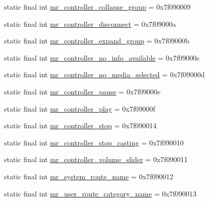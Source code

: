 \begin{CompactItemize}
\item 
static final int \hyperlink{classandroid_1_1support_1_1v7_1_1recyclerview_1_1_r_1_1string_75f471dcd88bd056d87ffdd26c831260}{mr\_\-controller\_\-collapse\_\-group} = 0x7f090009
\item 
static final int \hyperlink{classandroid_1_1support_1_1v7_1_1recyclerview_1_1_r_1_1string_8d0d9b278c876e697764cfe5bd5a7927}{mr\_\-controller\_\-disconnect} = 0x7f09000a
\item 
static final int \hyperlink{classandroid_1_1support_1_1v7_1_1recyclerview_1_1_r_1_1string_bd4773d756cf6048b5a33fa54cecfcad}{mr\_\-controller\_\-expand\_\-group} = 0x7f09000b
\item 
static final int \hyperlink{classandroid_1_1support_1_1v7_1_1recyclerview_1_1_r_1_1string_d6450755a675989679bec2088b9b10ed}{mr\_\-controller\_\-no\_\-info\_\-available} = 0x7f09000c
\item 
static final int \hyperlink{classandroid_1_1support_1_1v7_1_1recyclerview_1_1_r_1_1string_4b2053531010813cf927df1e6850ee00}{mr\_\-controller\_\-no\_\-media\_\-selected} = 0x7f09000d
\item 
static final int \hyperlink{classandroid_1_1support_1_1v7_1_1recyclerview_1_1_r_1_1string_41ad07dfb413e1e9961fa1dd73c8149d}{mr\_\-controller\_\-pause} = 0x7f09000e
\item 
static final int \hyperlink{classandroid_1_1support_1_1v7_1_1recyclerview_1_1_r_1_1string_3f9d46b56fe9b8dc07cf8994c078a47e}{mr\_\-controller\_\-play} = 0x7f09000f
\item 
static final int \hyperlink{classandroid_1_1support_1_1v7_1_1recyclerview_1_1_r_1_1string_45495f4083f80e1227b339e35cf4f636}{mr\_\-controller\_\-stop} = 0x7f090014
\item 
static final int \hyperlink{classandroid_1_1support_1_1v7_1_1recyclerview_1_1_r_1_1string_61f96113f71ae5198305f1952eb86227}{mr\_\-controller\_\-stop\_\-casting} = 0x7f090010
\item 
static final int \hyperlink{classandroid_1_1support_1_1v7_1_1recyclerview_1_1_r_1_1string_3ff268c14acd6a823db6676bff7f29e4}{mr\_\-controller\_\-volume\_\-slider} = 0x7f090011
\item 
static final int \hyperlink{classandroid_1_1support_1_1v7_1_1recyclerview_1_1_r_1_1string_55b4a7043ac70046284213523f5778e9}{mr\_\-system\_\-route\_\-name} = 0x7f090012
\item 
static final int \hyperlink{classandroid_1_1support_1_1v7_1_1recyclerview_1_1_r_1_1string_1a2593595e22a5944a93f43b1158c0ac}{mr\_\-user\_\-route\_\-category\_\-name} = 0x7f090013

\end{CompactItemize}
